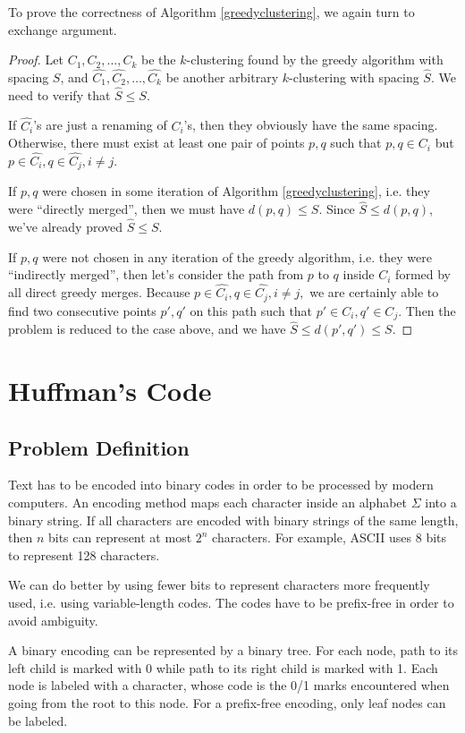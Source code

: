 To prove the correctness of Algorithm \ref{greedyclustering}, we again turn to exchange argument.
\begin{proof}
Let $C_1,C_2,\dots,C_k$ be the $k$-clustering found by the greedy algorithm with spacing $S$, and $\hat{C_1},\hat{C_2},\dots,\hat{C_k}$ be another arbitrary $k$-clustering with spacing $\hat{S}$. We need to verify that $\hat{S}\leq S$.

If $\hat{C_i}$'s are just a renaming of $C_i$'s, then they obviously have the same spacing. Otherwise, there must exist at least one pair of points $p,q$ such that $p,q\in C_i$ but $p\in \hat{C_i}, q\in\hat{C_j}, i\neq j.$

If $p,q$ were chosen in some iteration of Algorithm \ref{greedyclustering}, i.e. they were ``directly merged'', then we must have $d(p,q)\leq S$. Since $\hat{S}\leq d(p,q)$, we've already proved $\hat{S}\leq S$.

If $p,q$ were not chosen in any iteration of the greedy algorithm, i.e. they were ``indirectly merged'', then let's consider the path from $p$ to $q$ inside $C_i$ formed by all direct greedy merges. Because $p\in \hat{C_i}, q\in\hat{C_j}, i\neq j,$ we are certainly able to find two consecutive points $p',q'$ on this path such that $p'\in C_i, q'\in C_j$. Then the problem is reduced to the case above, and we have $\hat{S}\leq d(p',q')\leq S$.   
\end{proof}
\section{Huffman's Code}
\subsection{Problem Definition}
Text has to be encoded into binary codes in order to be processed by modern computers. An encoding method maps each character inside an alphabet $\Sigma$ into a binary string. If all characters are encoded with binary strings of the same length, then $n$ bits can represent at most $2^n$ characters. For example, ASCII uses 8 bits to represent 128 characters. 

We can do better by using fewer bits to represent characters more frequently used, i.e. using variable-length codes. The codes have to be prefix-free in order to avoid ambiguity.

A binary encoding can be represented by a binary tree. For each node, path to its left child is marked with 0 while path to its right child is marked with 1. Each node is labeled with a character, whose code is the 0/1 marks encountered when going from the root to this node. For a prefix-free encoding, only leaf nodes can be labeled.

